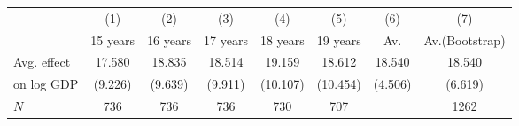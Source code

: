 \begin{tabular}{l*{7}{c}}
\hline\hline
            &\multicolumn{1}{c}{(1)}&\multicolumn{1}{c}{(2)}&\multicolumn{1}{c}{(3)}&\multicolumn{1}{c}{(4)}&\multicolumn{1}{c}{(5)}&\multicolumn{1}{c}{(6)}&\multicolumn{1}{c}{(7)}\\
            &    15 years&    16 years&    17 years&    18 years&    19 years&         Av.&Av.(Bootstrap)\\
\hline
Avg. effect &      17.580&      18.835&      18.514&      19.159&      18.612&      18.540&      18.540\\
on log GDP  &     (9.226)&     (9.639)&     (9.911)&    (10.107)&    (10.454)&     (4.506)&     (6.619)\\
\hline
\(N\)       &         736&         736&         736&         730&         707&            &        1262\\
\hline\hline
\end{tabular}
